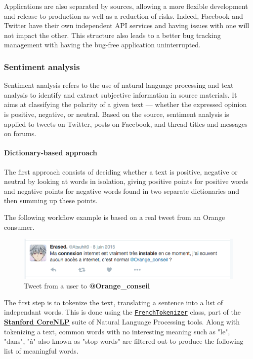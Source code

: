 \documentclass[11pt]{article}
\begin{document}
Applications are also separated by sources, allowing a more flexible development and release to production as well as a reduction of risks. Indeed, \textsf{Facebook} and \textsf{Twitter} have their own independent API services and having issues with one will not impact the other. This structure also leads to a better bug tracking management with having the bug-free application uninterrupted.

\subsubsection{Sentiment analysis}

Sentiment analysis refers to the use of natural language processing and text analysis to identify and extract subjective information in source materials. It aims at classifying the polarity of a given text — whether the expressed opinion is positive, negative, or neutral. 
Based on the source, sentiment analysis is applied to tweets on \textsf{Twitter}, posts on \textsf{Facebook}, and thread titles and messages on forums.

\paragraph{Dictionary-based approach}

The first approach consists of deciding whether a text is positive, negative or neutral by looking at words in isolation, giving positive points for positive words and negative points for negative words found in two separate dictionaries and then summing up these points.

The following workflow example is based on a real tweet from an \textsf{Orange} consumer.

\begin{figure}[h!]
    \centering
    \includegraphics[scale=0.6]{img/tweet1.png}
    \caption{Tweet from a user to \textbf{@Orange\_conseil}}
    \label{tweet1}
\end{figure}

The first step is to tokenize the text, translating a sentence into a list of independant words. This is done using the  \href{https://github.com/stanfordnlp/CoreNLP/blob/master/src/edu/stanford/nlp/international/french/process/FrenchTokenizer.java}{\texttt{FrenchTokenizer}} class, part of the \href{https://stanfordnlp.github.io/CoreNLP}{\textsf{\textbf{Stanford CoreNLP}}} suite of Natural Language Processing tools. Along with tokenizing a text, common words with no interesting meaning such as "le", "dans", "à" also known as "stop words" are filtered out to produce the following list of meaningful words.
\end{document}
